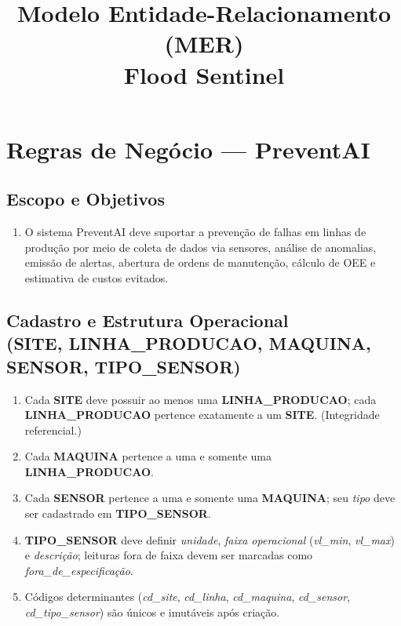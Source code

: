 \documentclass[a4paper,10pt]{article}
\title{\textbf{Modelo Entidade-Relacionamento (MER)\\Flood Sentinel}}
\date{}
\let\oldtextbf\textbf
\renewcommand{\textbf}[1]{{\footnotesize\oldtextbf{#1}}}
\begin{document}
\section*{Regras de Negócio — PreventAI}

\subsection*{Escopo e Objetivos}
\begin{enumerate}[label=RN-\arabic*,font=\footnotesize]
\item O sistema PreventAI deve suportar a prevenção de falhas em linhas de produção por meio de coleta de dados via sensores, análise de anomalias, emissão de alertas, abertura de ordens de manutenção, cálculo de OEE e estimativa de custos evitados.
\end{enumerate}

\subsection*{\small Cadastro e Estrutura Operacional \\ (SITE, LINHA\_PRODUCAO, MAQUINA, SENSOR, TIPO\_SENSOR)}
\begin{enumerate}[label=RN-1.\arabic*,font=\footnotesize]
\item Cada \textbf{SITE} deve possuir ao menos uma \textbf{LINHA\_PRODUCAO}; cada \textbf{LINHA\_PRODUCAO} pertence exatamente a um \textbf{SITE}. (Integridade referencial.)
\item Cada \textbf{MAQUINA} pertence a uma e somente uma \textbf{LINHA\_PRODUCAO}.
\item Cada \textbf{SENSOR} pertence a uma e somente uma \textbf{MAQUINA}; seu \textit{tipo} deve ser cadastrado em \textbf{TIPO\_SENSOR}.
\item \textbf{TIPO\_SENSOR} deve definir \textit{unidade}, \textit{faixa operacional} (\textit{vl\_min}, \textit{vl\_max}) e \textit{descrição}; leituras fora de faixa devem ser marcadas como \emph{fora\_de\_especificação}.
\item Códigos determinantes (\textit{cd\_site}, \textit{cd\_linha}, \textit{cd\_maquina}, \textit{cd\_sensor}, \textit{cd\_tipo\_sensor}) são únicos e imutáveis após criação.
\end{enumerate}
\end{document}
